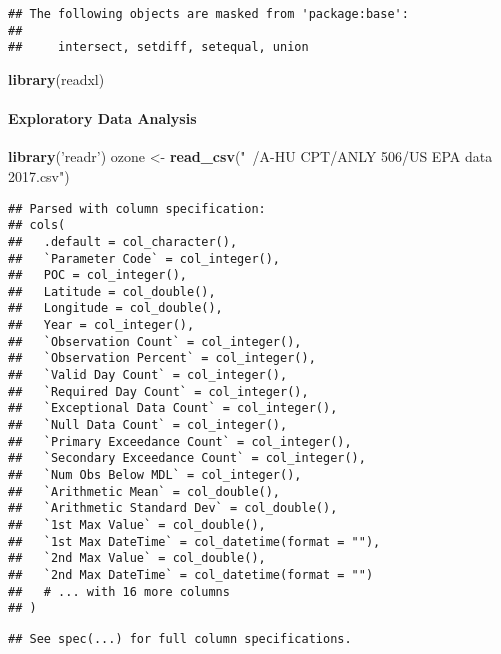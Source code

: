 \documentclass[]{article}
\newenvironment{Shaded}{\begin{snugshade}}{\end{snugshade}}
\newcommand{\KeywordTok}[1]{\textcolor[rgb]{0.13,0.29,0.53}{\textbf{#1}}}
\newcommand{\StringTok}[1]{\textcolor[rgb]{0.31,0.60,0.02}{#1}}
\newcommand{\NormalTok}[1]{#1}
\let\oldparagraph\paragraph
\renewcommand{\paragraph}[1]{\oldparagraph{#1}\mbox{}}
\begin{document}
\begin{verbatim}
## The following objects are masked from 'package:base':
## 
##     intersect, setdiff, setequal, union
\end{verbatim}

\begin{Shaded}
\begin{Highlighting}[]
\KeywordTok{library}\NormalTok{(readxl)}
\end{Highlighting}
\end{Shaded}

\paragraph{Exploratory Data Analysis}\label{exploratory-data-analysis}

\begin{Shaded}
\begin{Highlighting}[]
\KeywordTok{library}\NormalTok{(}\StringTok{'readr'}\NormalTok{)}
\NormalTok{ozone <-}\StringTok{ }\KeywordTok{read_csv}\NormalTok{(}\StringTok{"~/A-HU CPT/ANLY 506/US EPA data 2017.csv"}\NormalTok{)}
\end{Highlighting}
\end{Shaded}

\begin{verbatim}
## Parsed with column specification:
## cols(
##   .default = col_character(),
##   `Parameter Code` = col_integer(),
##   POC = col_integer(),
##   Latitude = col_double(),
##   Longitude = col_double(),
##   Year = col_integer(),
##   `Observation Count` = col_integer(),
##   `Observation Percent` = col_integer(),
##   `Valid Day Count` = col_integer(),
##   `Required Day Count` = col_integer(),
##   `Exceptional Data Count` = col_integer(),
##   `Null Data Count` = col_integer(),
##   `Primary Exceedance Count` = col_integer(),
##   `Secondary Exceedance Count` = col_integer(),
##   `Num Obs Below MDL` = col_integer(),
##   `Arithmetic Mean` = col_double(),
##   `Arithmetic Standard Dev` = col_double(),
##   `1st Max Value` = col_double(),
##   `1st Max DateTime` = col_datetime(format = ""),
##   `2nd Max Value` = col_double(),
##   `2nd Max DateTime` = col_datetime(format = "")
##   # ... with 16 more columns
## )
\end{verbatim}

\begin{verbatim}
## See spec(...) for full column specifications.
\end{verbatim}
\end{document}
